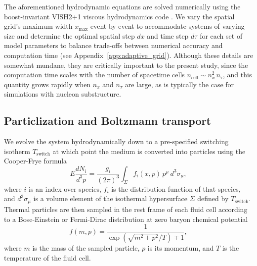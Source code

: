 \documentclass[aps,prc,reprint,amsmath,nofootinbib]{revtex4-1}
\newcommand{\Tsw}{T_\text{switch}}
\begin{document}
The aforementioned hydrodynamic equations are solved numerically using the boost-invariant VISH2+1 viscous hydrodynamics code \cite{Song:2007ux, Shen:2014vra}.
We vary the spatial grid's maximum width $x_\mathrm{max}$ event-by-event to accommodate systems of varying size and determine the optimal spatial step $dx$ and time step $d\tau$ for each set of model parameters to balance trade-offs between numerical accuracy and computation time (see Appendix~\ref{app:adaptive_grid}).
Although these details are somewhat mundane, they are critically important to the present study, since the computation time scales with the number of spacetime cells $n_\text{cell} \sim n_x^2\, n_\tau$, and this quantity grows rapidly when $n_x$ and $n_\tau$ are large, as is typically the case for simulations with nucleon substructure.

\subsection{Particlization and Boltzmann transport}

We evolve the system hydrodynamically down to a pre-specified switching isotherm $\Tsw$ at which point the medium is converted into particles using the Cooper-Frye formula \cite{PhysRevD.10.186}
\begin{equation}
  \label{cooper-frye}
  E \frac{dN_i}{d^3p} = \frac{g_i}{(2\pi)^3} \int_\Sigma f_i(x, p)\, p^\mu\, d^3\sigma_\mu,
\end{equation}
where $i$ is an index over species, $f_i$ is the distribution function of that species, and $d^3\sigma_\mu$ is a volume element of the isothermal hypersurface $\Sigma$ defined by $\Tsw$.
Thermal particles are then sampled in the rest frame of each fluid cell according to a Bose-Einstein or Fermi-Dirac distribution at zero baryon chemical potential
\begin{equation}
  \label{distribution}
  f(m, p) = \frac{1}{\exp(\sqrt{m^2 + p^2}/T) \mp 1},
\end{equation}
where $m$ is the mass of the sampled particle, $p$ is its momentum, and $T$ is the temperature of the fluid cell.
\end{document}
